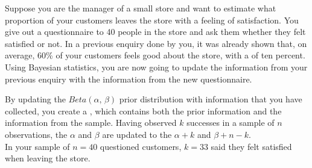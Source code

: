 \setcounter{section}{8}
\setcounter{subsection}{2}
\setcounter{question}{0}



Suppose you are the manager of a small store and want to estimate what proportion of your customers leaves the store with a feeling of satisfaction. You give out a questionnaire to 40 people in the store and ask them whether they felt satisfied or not. In a previous enquiry done by you, it was already shown that, on average, 60\% of your customers feels good about the store, with a  of ten percent. Using Bayesian statistics, you are now going to update the information from your previous enquiry with the information from the new questionnaire. \\




\emptyanswerbox{
    $\alpha$: \shortanswerline \hspace*{3cm} $\beta$: \shortanswerline
}


\rcodeanswertiny

By updating the $Beta(\alpha,\, \beta)$ prior distribution with information that you have collected, you create a , which contains both the prior information and the information from the sample. Having observed $k$ successes in a sample of $n$ observations, the  $\alpha$ and $\beta$ are updated to the  $\alpha + k$ and $\beta + n - k$. \\

In your sample of $n = 40$ questioned customers, $k = 33$ said they felt satisfied when leaving the store. \\


